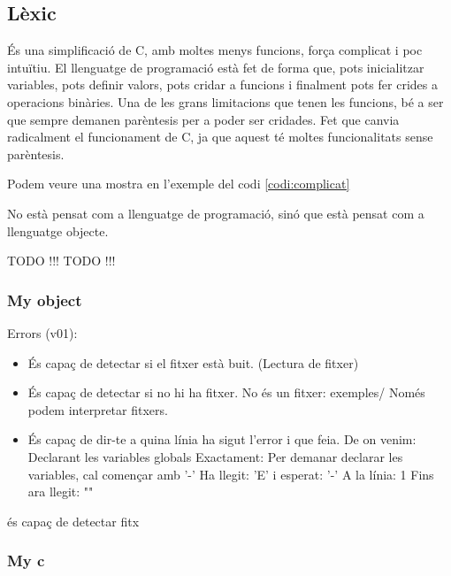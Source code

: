 \subsection{Lèxic}

És una simplificació de C,
amb moltes menys funcions,
força complicat i poc intuïtiu.
%
El llenguatge de programació està fet de forma que,
pots inicialitzar variables, pots definir valors, pots cridar a funcions
i finalment pots fer crides a operacions binàries.
%
Una de les grans limitacions que tenen les funcions,
bé a ser que sempre demanen parèntesis per a poder ser cridades.
Fet que canvia radicalment el funcionament de C,
ja que aquest té moltes funcionalitats sense parèntesis.

Podem veure una mostra en l'exemple del codi \ref{codi:complicat}


No està pensat com a llenguatge de programació,
sinó que està pensat com a llenguatge objecte.

TODO !!! TODO !!!


\subsubsection{My object}
Errors (v01):
\begin{itemize}
    \item És capaç de detectar si el fitxer està buit. (Lectura de fitxer)
    \item És capaç de detectar si no hi ha fitxer.
        \subitem No és un fitxer: exemples/
        \subitem Només podem interpretar fitxers.
    \item És capaç de dir-te a quina línia ha sigut l'error i que feia.
        \subitem De on venim:
        \subitem Declarant les variables globals
        \subitem Exactament:
        \subitem Per demanar declarar les variables, cal començar amb '-'
        \subitem Ha llegit: 'E' i esperat: '-'
        \subitem A la línia: 1
        \subitem Fins ara llegit:
        \subitem ""
\end{itemize}
és capaç de detectar fitx

\subsubsection{My c}
